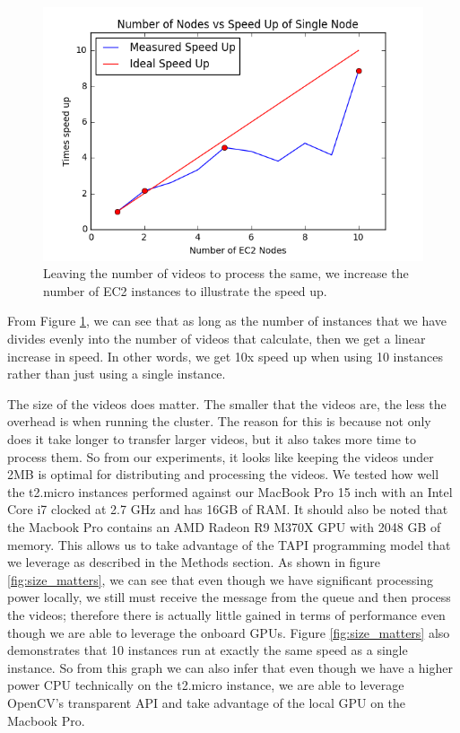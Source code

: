 \begin{figure}[h]
  \label{fig:speed_up}
  \centering
  \includegraphics[width=.8\textwidth]{figures/speed_up}
  \caption{Leaving the number of videos to process the same, we increase the
  number of EC2 instances to illustrate the speed up.}
\end{figure}

From Figure \ref{fig:speed_up}, we can see that as long as the number of instances
that we have divides evenly into the number of videos that calculate, then we
get a linear increase in speed. In other words, we get 10x speed up when using
10 instances rather than just using a single instance.

The size of the videos does matter. The smaller that the videos are, the less
the overhead is when running the cluster. The reason for this is because not only
does it take longer to transfer larger videos, but it also takes more time to process
them. So from our experiments, it looks like keeping the videos under 2MB is optimal
for distributing and processing the videos.
We tested how well the t2.micro instances performed against our MacBook Pro 15 inch
with an Intel Core i7 clocked at 2.7 GHz and has 16GB of RAM. It should also be
noted that the Macbook Pro contains an AMD Radeon R9 M370X GPU with 2048 GB of
memory. This allows us to take advantage of the TAPI programming model that
we leverage as described in the Methods section.  As shown in figure \ref{fig:size_matters},
we can see that even though we have significant processing power locally, we still
must receive the message from the queue and then process the videos; therefore
there is actually little gained in terms of performance even though we are able
to leverage the onboard GPUs. Figure \ref{fig:size_matters} also demonstrates
that 10 instances run at exactly the same speed as a single instance. So from this
graph we can also infer that even though we have a higher power CPU technically
on the t2.micro instance, we are able to leverage OpenCV's transparent API and
take advantage of the local GPU on the Macbook Pro.


